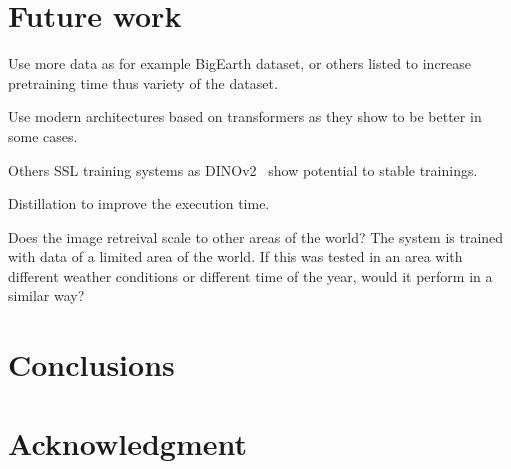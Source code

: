 \documentclass[conference]{IEEEtran}
\begin{document}
    \section{Future work}
    Use more data as for example BigEarth dataset, or others listed to increase pretraining time thus variety of the dataset.

    Use modern architectures based on transformers as they show to be better in some cases.

    Others SSL training systems as DINOv2~\cite{DINO} show potential to stable trainings.

    Distillation to improve the execution time.

    Does the image retreival scale to other areas of the world? The system is trained with data of a limited area of the world.
    If this was tested in an area with different weather conditions or different time of the year, would it perform in a similar way?


    \section{Conclusions}

    \section*{Acknowledgment}

    
\end{document}
